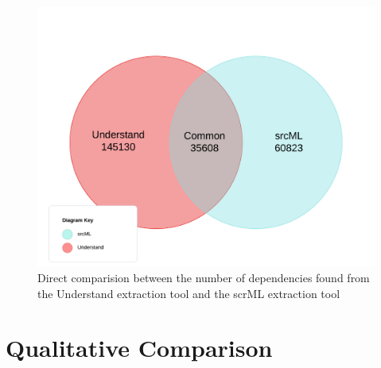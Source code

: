 \documentclass[12pt, dvipsnames, a4paper]{article}
\begin{document}
\begin{figure}[H]
	\center
	\includegraphics[width = 450pt]{assets/UnderstandSrcML.jpeg}
	\caption{Direct comparision between the number of dependencies found from the Understand extraction tool and the scrML extraction tool}
\end{figure}


\section{Qualitative Comparison}
\end{document}
